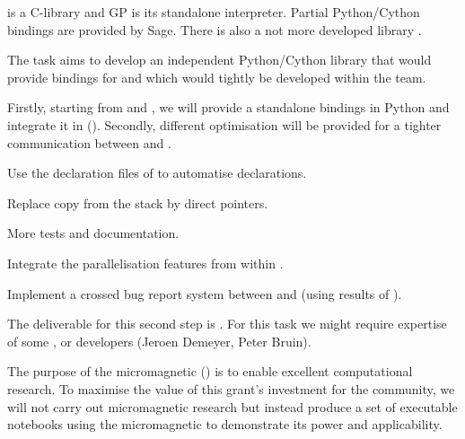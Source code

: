 \begin{workpackage}
\begin{tasklist}
\begin{task}[lead=UB,title=Python/Cython bindings for \Pari,PM=16,id=pari-python,partners={UB,UG},wphases=0-48,issue=80]
  \Pari is a C-library and GP is its standalone interpreter. Partial
  Python/Cython bindings are provided by Sage. There is also a not
  more developed library .

  The task aims to develop an independent Python/Cython library that
  would provide bindings for \PariGP and which would tightly be
  developed within the \PariGP team.

  Firstly, starting from \Sage and , we will provide a standalone \Pari bindings in Python
  and integrate it in \Sage (). Secondly, different optimisation
  will be provided for a tighter communication between \Pari and \Python.
  \begin{compactitem}
  \item Use the declaration files of  to automatise \Cython declarations.
  \item Replace copy from the \Pari stack by direct pointers.
  \item More tests and documentation.
  \item Integrate the parallelisation features from  within \Python.
  \item Implement a crossed bug report system between \Sage and \Pari (using
  results of ).
  \end{compactitem}
  The deliverable for this second step is . For this task we might
  require expertise of some \Sage, \Pari or \Cython developers (Jeroen Demeyer, Peter Bruin).
\end{task}

\begin{task}[lead=USO,title=Demonstrator: micromagnetic VRE notebooks,
  id=oommf-tutorial-and-documentation,PM=6,partners={SR,PS},wphases=19-25,issue=81]
  The purpose of the micromagnetic \VRE
  () is to enable excellent
  computational research. To maximise the value of this grant's
  investment for the community, we will not carry out micromagnetic
  research but instead produce a set of executable notebooks using the
  micromagnetic \VRE to demonstrate its power and applicability.


\end{task}
\end{tasklist}
\end{workpackage}
